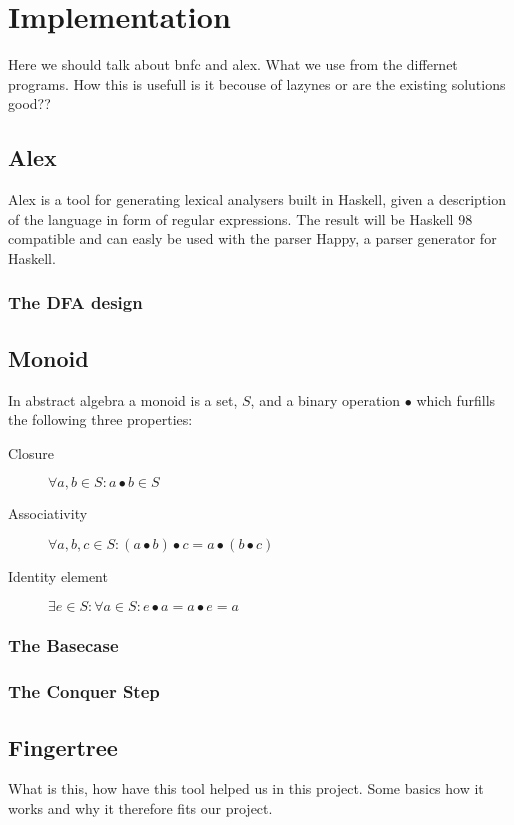 \chapter{Implementation}
Here we should talk about bnfc and
alex. What we use from the differnet programs. How this is usefull
is it becouse of lazynes or are the existing solutions good??

\section{Alex}
Alex is a tool for generating lexical analysers built in Haskell, given a description of the language
in form of regular expressions. The result will be Haskell 98 compatible and can easly be used with the
parser Happy, a parser generator for Haskell.
\subsection{The DFA design}

\section{Monoid}
In abstract algebra a monoid is a set, $S$, and a binary operation $\bullet$ which furfills the following
three properties:
\begin{description}
\item[Closure] $\forall a,b \in S: a \bullet b \in S$
\item[Associativity] $\forall a,b,c \in S: (a \bullet b) \bullet c = a \bullet (b \bullet c)$
\item[Identity element] $\exists e \in S: \forall a \in S: e \bullet a = a \bullet e = a$
\end{description}

\subsection{The Basecase}
\subsection{The Conquer Step}

\section{Fingertree}
What is this, how have this tool helped us in this project.
Some basics how it works and why it therefore fits our project.

